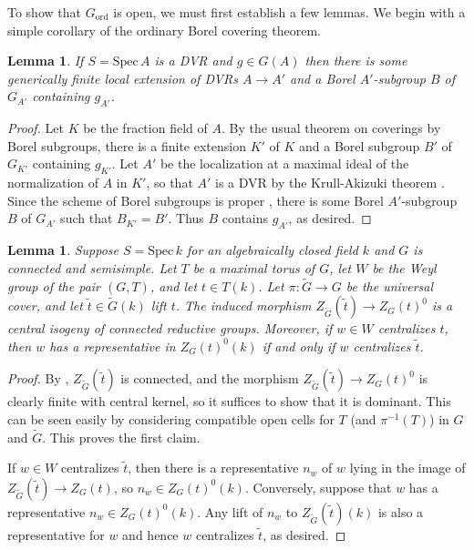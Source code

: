 \documentclass[11pt,reqno]{amsart}
\newtheorem{lemma}[theorem]{Lemma}
\theoremstyle{definition}
\renewcommand{\rm}{\mathrm}
\newcommand{\Spec}{\mathrm{Spec} \,}
\begin{document}
To show that $G_{\rm{ord}}$ is open, we must first establish a few lemmas. We begin with a simple corollary of the ordinary Borel covering theorem.

\begin{lemma}\label{lemma:dvr-covering-by-borels}
If $S = \Spec A$ is a DVR and $g \in G(A)$ then there is some generically finite local extension of DVRs $A \to A'$ and a Borel $A'$-subgroup $B$ of $G_{A'}$ containing $g_{A'}$.
\end{lemma}

\begin{proof}
Let $K$ be the fraction field of $A$. By the usual theorem on coverings by Borel subgroups, there is a finite extension $K'$ of $K$ and a Borel subgroup $B'$ of $G_{K'}$ containing $g_{K'}$. Let $A'$ be the localization at a maximal ideal of the normalization of $A$ in $K'$, so that $A'$ is a DVR by the Krull-Akizuki theorem \cite[Thm.\ 11.7]{Matsumura}. Since the scheme of Borel subgroups is proper \cite[Cor.\ 5.2.8]{Conrad}, there is some Borel $A'$-subgroup $B$ of $G_{A'}$ such that $B_{K'} = B'$. Thus $B$ contains $g_{A'}$, as desired.
\end{proof}

\begin{lemma}\label{lemma:Weyl-elements-in-identity-component}
Suppose $S = \Spec k$ for an algebraically closed field $k$ and $G$ is connected and semisimple. Let $T$ be a maximal torus of $G$, let $W$ be the Weyl group of the pair $(G, T)$, and let $t \in T(k)$. Let $\pi: \widetilde{G} \to G$ be the universal cover, and let $\widetilde{t} \in \widetilde{G}(k)$ lift $t$. The induced morphism $Z_{\widetilde{G}}(\widetilde{t}) \to Z_G(t)^0$ is a central isogeny of connected reductive groups. Moreover, if $w \in W$ centralizes $t$, then $w$ has a representative in $Z_G(t)^0(k)$ if and only if $w$ centralizes $\widetilde{t}$.
\end{lemma}

\begin{proof}
By \cite[Thm.\ 2.15]{SteinbergTorsion}, $Z_{\widetilde{G}}(\widetilde{t})$ is connected, and the morphism $Z_{\widetilde{G}}(\widetilde{t}) \to Z_G(t)^0$ is clearly finite with central kernel, so it suffices to show that it is dominant. This can be seen easily by considering compatible open cells for $T$ (and $\pi^{-1}(T)$) in $G$ and $\widetilde{G}$. This proves the first claim. \smallskip

If $w \in W$ centralizes $\widetilde{t}$, then there is a representative $n_w$ of $w$ lying in the image of $Z_{\widetilde{G}}(\widetilde{t}) \to Z_G(t)$, so $n_w \in Z_G(t)^0(k)$. Conversely, suppose that $w$ has a representative $n_w \in Z_G(t)^0(k)$. Any lift of $n_w$ to $Z_{\widetilde{G}}(\widetilde{t})(k)$ is also a representative for $w$ and hence $w$ centralizes $\widetilde{t}$, as desired.
\end{proof}
\end{document}
